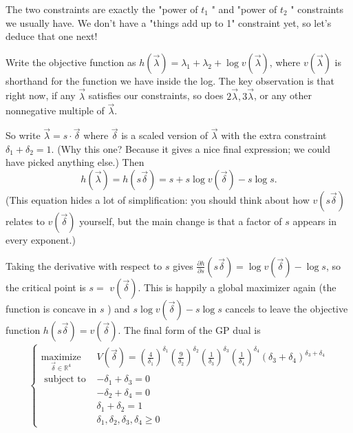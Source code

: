 \documentclass[11pt,a4paper]{article}
\begin{document}
The two constraints are exactly the "power of $t_1$ " and "power of $t_2$ " constraints we usually have.
We don't have a "things add up to 1" constraint yet, so let's deduce that one next!

Write the objective function as $h(\vec{\lambda})=\lambda_1+\lambda_2+\log v(\vec{\lambda})$, where $v(\vec{\lambda})$ is shorthand for the function we have inside the log. The key observation is that right now, if any $\vec{\lambda}$ satisfies our constraints, so does $2 \vec{\lambda}, 3 \vec{\lambda}$, or any other nonnegative multiple of $\vec{\lambda}$.

So write $\vec{\lambda}=s \cdot \vec{\delta}$ where $\vec{\delta}$ is a scaled version of $\vec{\lambda}$ with the extra constraint $\delta_1+\delta_2=1$. (Why this one? Because it gives a nice final expression; we could have picked anything else.) Then
$$
h(\vec{\lambda})=h(s \vec{\delta})=s+s \log v(\vec{\delta})-s \log s .
$$
(This equation hides a lot of simplification: you should think about how $v(s \vec{\delta})$ relates to $v(\vec{\delta})$ yourself, but the main change is that a factor of $s$ appears in every exponent.)

Taking the derivative with respect to $s$ gives $\frac{\partial h}{\partial s}(s \vec{\delta})=\log v(\vec{\delta})-\log s$, so the critical point is $s=$ $v(\vec{\delta})$. This is happily a global maximizer again (the function is concave in $s$ ) and $s \log v(\vec{\delta})-s \log s$ cancels to leave the objective function $h(s \vec{\delta})=v(\vec{\delta})$. The final form of the GP dual is
\begin{equation}
    \begin{aligned}
        \begin{cases}\underset{\vec{\delta} \in \mathbb{R}^4}{\operatorname{maximize}} & V(\vec{\delta})=\left(\frac{4}{\delta_1}\right)^{\delta_1}\left(\frac{9}{\delta_2}\right)^{\delta_2}\left(\frac{1}{\delta_3}\right)^{\delta_3}\left(\frac{1}{\delta_4}\right)^{\delta_4}\left(\delta_3+\delta_4\right)^{\delta_3+\delta_4} \\ \text { subject to } & -\delta_1+\delta_3=0 \\ & -\delta_2+\delta_4=0 \\ &\delta_1+\delta_2=1 \\ & \delta_1, \delta_2, \delta_3, \delta_4 \geq 0\end{cases}
    \end{aligned}
    \tag{D}
\end{equation}
\end{document}
